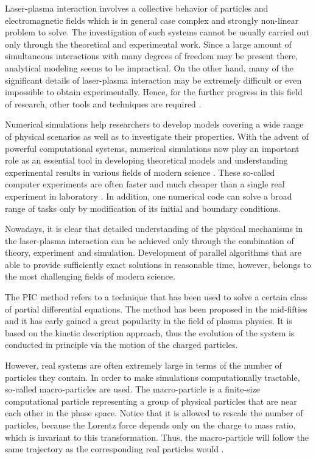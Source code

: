 Laser-plasma interaction involves a collective behavior of particles and electromagnetic fields which is in general case complex and strongly non-linear problem to solve. The investigation of such systems cannot be usually carried out only through the theoretical and experimental work. Since a large amount of simultaneous interactions with many degrees of freedom may be present there, analytical modeling seems to be impractical. On the other hand, many of the significant details of laser-plasma interaction may be extremely difficult or even impossible to obtain experimentally. Hence, for the further progress in this field of research, other tools and techniques are required \cite{jaroszynsky}.

Numerical simulations help researchers to develop models covering a wide range of physical scenarios as well as to investigate their properties. With the advent of powerful computational systems, numerical simulations now play an important role as an essential tool in developing theoretical models and understanding experimental results in various fields of modern science \cite{pang}. These so-called computer experiments are often faster and much cheaper than a single real experiment in laboratory \cite{gould}. In addition, one numerical code can solve a broad range of tasks only by modification of its initial and boundary conditions.

Nowadays, it is clear that detailed understanding of the physical mechanisms in the laser-plasma interaction can be achieved only through the combination of theory, experiment and simulation. Development of parallel algorithms that are able to provide sufficiently exact solutions in reasonable time, however, belongs to the most challenging fields of modern science.

The PIC method refers to a technique that has been used to solve a certain class of partial differential equations. The method has been proposed in the mid-fifties and it has early gained a great popularity in the field of plasma physics. It is based on the kinetic description approach, thus the evolution of the system is conducted in principle via the motion of the charged particles.

However, real systems are often extremely large in terms of the number of particles they contain. In order to make simulations computationally tractable, so-called macro-particles are used. The macro-particle is a finite-size computational particle representing a group of physical particles that are near each other in the phase space. Notice that it is allowed to rescale the number of particles, because the Lorentz force depends only on the charge to mass ratio, which is invariant to this transformation. Thus, the macro-particle will follow the same trajectory as the corresponding real particles would \cite{hockney}.

